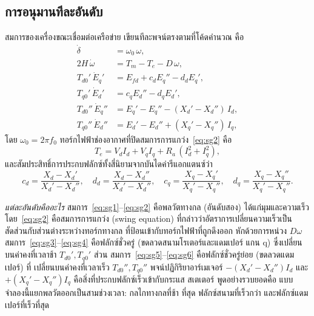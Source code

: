 \documentclass[12pt,a4paper]{article}
\begin{document}
\subsection{การอนุมานทีละอันดับ}
สมการของเครื่องขณะเชื่อมต่อเครือข่าย เขียนทีละพจน์ตรงตามที่โค้ดคำนวณ คือ
\begin{align}
  \dot\delta            &= \omega_0\,\omega, \label{eq:sg1}\\
  2H\,\dot\omega        &= T_m - T_e - D\,\omega, \label{eq:sg2}\\
  T_{d0}'\,\dot{E}_q'   &= E_{fd} + c_d E_q'' - d_d E_q', \label{eq:sg3}\\
  T_{q0}'\,\dot{E}_d'   &= c_q E_d'' - d_q E_d', \label{eq:sg4}\\
  T_{d0}''\,\dot{E}_q''  &= E_q' - E_q'' - (X_d'-X_d'')\,I_d, \label{eq:sg5}\\
  T_{q0}''\,\dot{E}_d''  &= E_d' - E_d'' + (X_q'-X_q'')\,I_q, \label{eq:sg6}
\end{align}
โดย $\omega_0=2\pi f_0$ ทอร์กไฟฟ้าช่องอากาศที่ปิดสมการการแกว่ง~\eqref{eq:sg2} คือ
\begin{equation}
  T_e = V_d I_d + V_q I_q + R_a\,(I_d^2+I_q^2), \label{eq:sgte}
\end{equation}
และสัมประสิทธิ์การประกบฟลักซ์ทั้งสี่นิยามจากบันไดค่ารีแอกแตนซ์ว่า
\begin{equation}
  c_d=\frac{X_d-X_d'}{X_d'-X_d''},\quad
  d_d=\frac{X_d-X_d''}{X_d'-X_d''},\quad
  c_q=\frac{X_q-X_q'}{X_q'-X_q''},\quad
  d_q=\frac{X_q-X_q''}{X_q'-X_q''}.
  \label{eq:cddd}
\end{equation}

\emph{แต่ละอันดับคืออะไร} สมการ~\eqref{eq:sg1}--\eqref{eq:sg2} คือพลวัตทางกล
(อันดับสอง) ได้แก่มุมและความเร็ว โดย~\eqref{eq:sg2} คือสมการการแกว่ง (swing
equation) ที่กล่าวว่าอัตราการเปลี่ยนความเร็วเป็นสัดส่วนกับส่วนต่างระหว่างทอร์กทางกล
ที่ป้อนเข้ากับทอร์กไฟฟ้าที่ถูกดึงออก หักด้วยการหน่วง $D\omega$
สมการ~\eqref{eq:sg3}--\eqref{eq:sg4} คือฟลักซ์ชั่วครู่ (ขดลวดสนามโรเตอร์และแดมเปอร์
แกน q) ซึ่งเปลี่ยนบนค่าคงที่เวลาช้า $T_{d0}',T_{q0}'$ ส่วน
สมการ~\eqref{eq:sg5}--\eqref{eq:sg6} คือฟลักซ์ชั่วครู่ย่อย (ขดลวดแดมเปอร์) ที่
เปลี่ยนบนค่าคงที่เวลาเร็ว $T_{d0}'',T_{q0}''$ พจน์ปฏิกิริยาอาร์เมเจอร์
$-(X_d'-X_d'')I_d$ และ $+(X_q'-X_q'')I_q$ คือสิ่งที่ประกบฟลักซ์เร็วเข้ากับกระแส
สเตเตอร์ พูดอย่างรวบยอดคือ แบบจำลองนี้แยกพลวัตออกเป็นสามช่วงเวลา: กลไกทางกลที่ช้า
ที่สุด ฟลักซ์สนามที่เร็วกว่า และฟลักซ์แดมเปอร์ที่เร็วที่สุด
\end{document}
